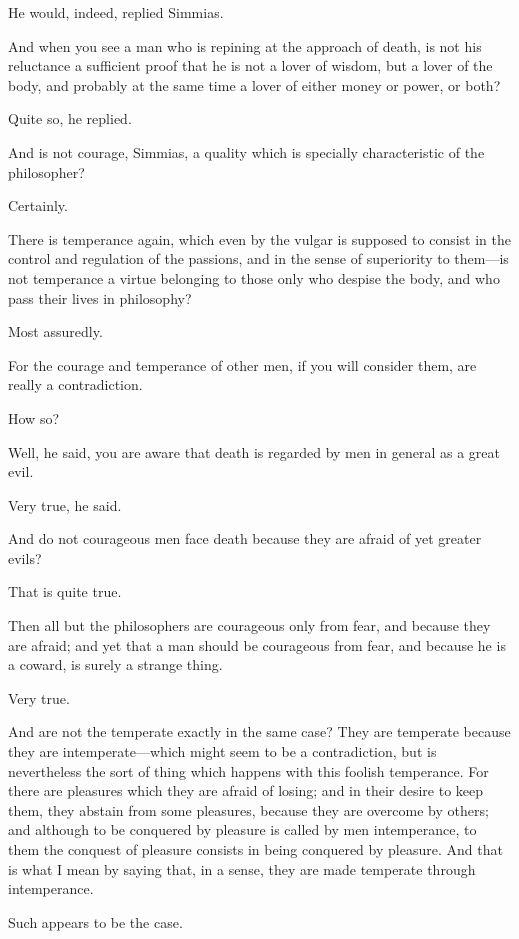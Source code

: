 He would, indeed, replied Simmias.

And when you see a man who is repining at the approach of death, is not
his reluctance a sufficient proof that he is not a lover of wisdom, but a
lover of the body, and probably at the same time a lover of either money
or power, or both?

Quite so, he replied.

And is not courage, Simmias, a quality which is specially characteristic
of the philosopher?

Certainly.

There is temperance again, which even by the vulgar is supposed to consist
in the control and regulation of the passions, and in the sense of
superiority to them—is not temperance a virtue belonging to those
only who despise the body, and who pass their lives in philosophy?

Most assuredly.

For the courage and temperance of other men, if you will consider them,
are really a contradiction.

How so?

Well, he said, you are aware that death is regarded by men in general as a
great evil.

Very true, he said.

And do not courageous men face death because they are afraid of yet
greater evils?

That is quite true.

Then all but the philosophers are courageous only from fear, and because
they are afraid; and yet that a man should be courageous from fear, and
because he is a coward, is surely a strange thing.

Very true.

And are not the temperate exactly in the same case? They are temperate
because they are intemperate—which might seem to be a contradiction,
but is nevertheless the sort of thing which happens with this foolish
temperance. For there are pleasures which they are afraid of losing; and
in their desire to keep them, they abstain from some pleasures, because
they are overcome by others; and although to be conquered by pleasure is
called by men intemperance, to them the conquest of pleasure consists in
being conquered by pleasure. And that is what I mean by saying that, in a
sense, they are made temperate through intemperance.

Such appears to be the case.

